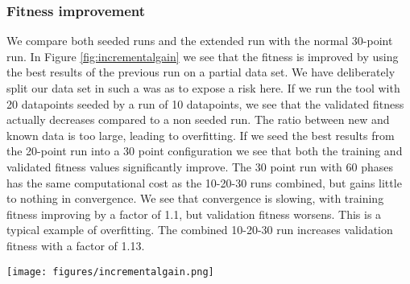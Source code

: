 \subsubsection{Fitness improvement}
We compare both seeded runs and the extended run with the normal 30-point run. In Figure \ref{fig:incrementalgain} we see that the fitness is improved by using the best results of the previous run on a partial data set. We have deliberately split our data set in such a was as to expose a risk here. If we run the tool with 20 datapoints seeded by a run of 10 datapoints, we see that the validated fitness actually decreases compared to a non seeded run. The ratio between new and known data is too large, leading to overfitting. If we seed the best results from the 20-point run into a 30 point configuration we see that both the training and validated fitness values significantly improve. 
The 30 point run with 60 phases has the same computational cost as the 10-20-30 runs combined, but gains little to nothing in convergence. We see that convergence is slowing, with training fitness improving by a factor of 1.1, but validation fitness worsens. This is a typical example of overfitting. The combined 10-20-30 run increases validation fitness with a factor of 1.13.
\begin{figure*}
    \centering
    \texttt{[image: figures/incrementalgain.png]}
    \caption{Incremental fitness gain in CSRM.}
    \label{fig:incrementalgain}
\end{figure*}


